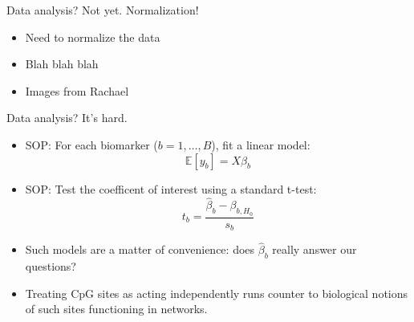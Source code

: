 \documentclass[12pt,t]{beamer}
\begin{document}

\begin{frame}[c]{Data analysis? Not yet. Normalization!}

\begin{center}
\begin{itemize}
  \item Need to normalize the data
  \item Blah blah blah
  \item Images from Rachael
\end{itemize}
\end{center}


\end{frame}


\begin{frame}[c]{Data analysis? It's hard.}
\begin{center}
\begin{itemize}
  \itemsep12pt
  \item SOP: For each biomarker ($b = 1, \dots, B$), fit a linear model:
    \[
    \mathbb{E}[y_b] = X \beta_b
    \]
  \item SOP: Test the coefficent of interest using a standard t-test:
    \[
      t_{b} = \frac{\hat{\beta}_{b} - \beta_{b, H_0}}{s_b}
    \]
  \item Such models are a matter of convenience: does $\hat{\beta}_{b}$ really
    answer our questions?
  \item Treating CpG sites as acting independently runs counter to biological
    notions of such sites functioning in networks.
\end{itemize}
\end{center}


\note{
}
\end{frame}

\end{document}

